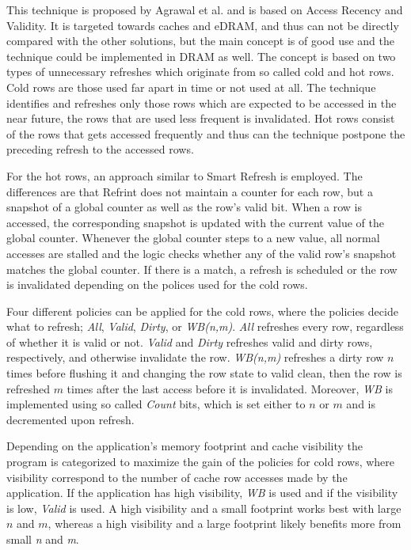 This technique is proposed by Agrawal et al. \cite{refrint} and is based on Access Recency and Validity. It is targeted towards caches and eDRAM, and thus can not be directly compared with the other solutions, but the main concept is of good use and the technique could be implemented in DRAM as well. The concept is based on two types of unnecessary refreshes which originate from so called cold and hot rows. Cold rows are those used far apart in time or not used at all. The technique identifies and refreshes only those rows which are expected to be accessed in the near future, the rows that are used less frequent is invalidated. Hot rows consist of the rows that gets accessed frequently and thus can the technique postpone the preceding refresh to the accessed rows.

For the hot rows, an approach similar to Smart Refresh is employed. The differences are that Refrint does not maintain a counter for each row, but a snapshot of a global counter as well as the row's valid bit. When a row is accessed, the corresponding snapshot is updated with the current value of the global counter. Whenever the global counter steps to a new value, all normal accesses are stalled and the logic checks whether any of the valid row's snapshot matches the global counter. If there is a match, a refresh is scheduled or the row is invalidated depending on the polices used for the cold rows. 

Four different policies can be applied for the cold rows, where the policies decide what to refresh; \textit{All}, \textit{Valid}, \textit{Dirty}, or \textit{WB(n,m)}. \textit{All} refreshes every row, regardless of whether it is valid or not. \textit{Valid} and \textit{Dirty} refreshes valid and dirty rows, respectively, and otherwise invalidate the row. \textit{WB(n,m)} refreshes a dirty row $n$ times before flushing it and changing the row state to valid clean, then the row is refreshed $m$ times after the last access before it is invalidated. Moreover, \textit{WB} is implemented using so called \textit{Count} bits, which is set either to $n$ or $m$ and is decremented upon refresh. %


Depending on the application's memory footprint and cache visibility the program is categorized to maximize the gain of the policies for cold rows, where visibility correspond to the number of cache row accesses made by the application. If the application has high visibility, \textit{WB} is used and if the visibility is low, \textit{Valid} is used. A high visibility and a small footprint works best with large $n$ and $m$, whereas a high visibility and a large footprint likely benefits more from small \textit{n} and \textit{m}. 

